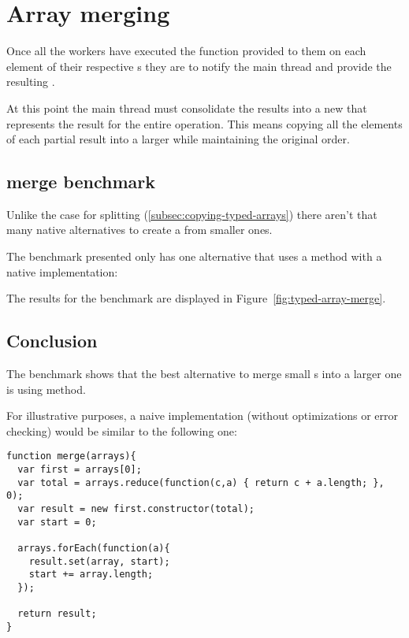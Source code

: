 \section{Array merging}

Once all the workers have executed the function provided to them on each element of their respective \ttarray{}s they are to notify the main thread and provide the resulting \ttarray{}.

At this point the main thread must consolidate the results into a new \ttarray{} that represents the result for the entire operation. This means copying all the elements of each partial result into a larger \ttarray{} while maintaining the original order.

\subsection{\ttarray{} merge benchmark}
Unlike the case for \ttarray{} splitting (\ref{subsec:copying-typed-arrays}) there aren't that many native alternatives to create a \ttarray{} from smaller ones.

The benchmark presented only has one alternative that uses a method with a native implementation:

The results for the benchmark are displayed in Figure~\ref{fig:typed-array-merge}.

\subsection{Conclusion}
The benchmark shows that the best alternative to merge small \ttarray{}s into a larger one is using  method.

For illustrative purposes, a naive implementation (without optimizations or error checking) would be similar to the following one:
\begin{lstlisting}[caption=Simple \ttarray{} merge function]
function merge(arrays){
  var first = arrays[0];
  var total = arrays.reduce(function(c,a) { return c + a.length; }, 0);
  var result = new first.constructor(total);
  var start = 0;

  arrays.forEach(function(a){
    result.set(array, start);
    start += array.length;
  });

  return result;
}
\end{lstlisting}

\pagebreak